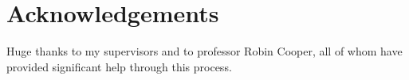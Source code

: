 \documentclass[11pt, a4paper]{article}
\begin{document}
\thispagestyle{empty}

\newpage
\section*{Acknowledgements}

Huge thanks to my supervisors and to professor Robin Cooper, all of whom have provided significant help through this process.

\thispagestyle{empty}

\newpage

\begin{spacing}{0.0}
\glsresetall
\tableofcontents
\end{spacing}

\thispagestyle{empty}

\newpage
\setcounter{page}{1}









\begin{appendices}
\newpage

\end{appendices}
\end{document}

